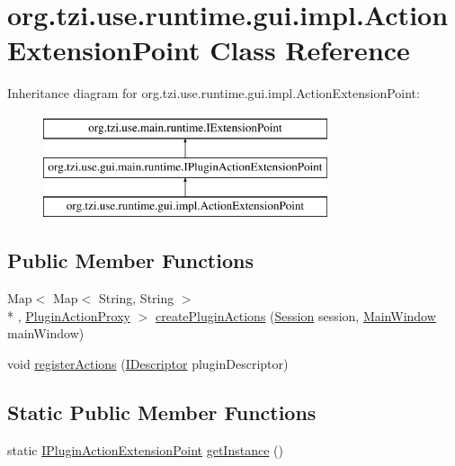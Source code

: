 \hypertarget{classorg_1_1tzi_1_1use_1_1runtime_1_1gui_1_1impl_1_1_action_extension_point}{\section{org.\-tzi.\-use.\-runtime.\-gui.\-impl.\-Action\-Extension\-Point Class Reference}
\label{classorg_1_1tzi_1_1use_1_1runtime_1_1gui_1_1impl_1_1_action_extension_point}
}
Inheritance diagram for org.\-tzi.\-use.\-runtime.\-gui.\-impl.\-Action\-Extension\-Point\-:\begin{figure}[H]
\begin{center}
\leavevmode
\includegraphics[height=3.000000cm]{classorg_1_1tzi_1_1use_1_1runtime_1_1gui_1_1impl_1_1_action_extension_point}
\end{center}
\end{figure}
\subsection*{Public Member Functions}
\begin{DoxyCompactItemize}
\item 
Map$<$ Map$<$ String, String $>$\\*
, \hyperlink{classorg_1_1tzi_1_1use_1_1runtime_1_1gui_1_1impl_1_1_plugin_action_proxy}{Plugin\-Action\-Proxy} $>$ \hyperlink{classorg_1_1tzi_1_1use_1_1runtime_1_1gui_1_1impl_1_1_action_extension_point_aac0b5f4172931f4488a306bfc89e75be}{create\-Plugin\-Actions} (\hyperlink{classorg_1_1tzi_1_1use_1_1main_1_1_session}{Session} session, \hyperlink{classorg_1_1tzi_1_1use_1_1gui_1_1main_1_1_main_window}{Main\-Window} main\-Window)
\item 
void \hyperlink{classorg_1_1tzi_1_1use_1_1runtime_1_1gui_1_1impl_1_1_action_extension_point_ae7fbe25ffdbf688e3bf620ec320a96a3}{register\-Actions} (\hyperlink{interfaceorg_1_1tzi_1_1use_1_1main_1_1runtime_1_1_i_descriptor}{I\-Descriptor} plugin\-Descriptor)
\end{DoxyCompactItemize}
\subsection*{Static Public Member Functions}
\begin{DoxyCompactItemize}
\item 
static \hyperlink{interfaceorg_1_1tzi_1_1use_1_1gui_1_1main_1_1runtime_1_1_i_plugin_action_extension_point}{I\-Plugin\-Action\-Extension\-Point} \hyperlink{classorg_1_1tzi_1_1use_1_1runtime_1_1gui_1_1impl_1_1_action_extension_point_a4be2986eaa218f62851ddf33a1c7bdb3}{get\-Instance} ()
\end{DoxyCompactItemize}


